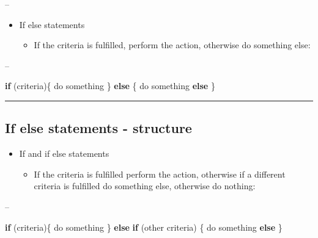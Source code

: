\documentclass[]{article}
\newenvironment{Shaded}{\begin{snugshade}}{\end{snugshade}}
\newcommand{\ControlFlowTok}[1]{\textcolor[rgb]{0.13,0.29,0.53}{\textbf{#1}}}
\newcommand{\NormalTok}[1]{#1}
\providecommand{\tightlist}{%
  \setlength{\itemsep}{0pt}\setlength{\parskip}{0pt}}
\begin{document}
--

\begin{itemize}
\tightlist
\item
  If else statements

  \begin{itemize}
  \tightlist
  \item
    If the criteria is fulfilled, perform the action, otherwise do
    something else:
  \end{itemize}
\end{itemize}

--

\begin{Shaded}
\begin{Highlighting}[]
\ControlFlowTok{if}\NormalTok{ (criteria)\{}
\NormalTok{  do something}
\NormalTok{\} }\ControlFlowTok{else}\NormalTok{ \{}
\NormalTok{  do something }\ControlFlowTok{else}
\NormalTok{\}}
\end{Highlighting}
\end{Shaded}

\begin{center}\rule{0.5\linewidth}{\linethickness}\end{center}

\hypertarget{if-else-statements---structure-1}{%
\subsection{If else statements -
structure}\label{if-else-statements---structure-1}}

\begin{itemize}
\tightlist
\item
  If and if else statements

  \begin{itemize}
  \tightlist
  \item
    If the criteria is fulfilled perform the action, otherwise if a
    different criteria is fulfilled do something else, otherwise do
    nothing:
  \end{itemize}
\end{itemize}

--

\begin{Shaded}
\begin{Highlighting}[]
\ControlFlowTok{if}\NormalTok{ (criteria)\{}
\NormalTok{  do something}
\NormalTok{\} }\ControlFlowTok{else} \ControlFlowTok{if}\NormalTok{ (other criteria) \{}
\NormalTok{  do something }\ControlFlowTok{else}
\NormalTok{\}}
\end{Highlighting}
\end{Shaded}
\end{document}
